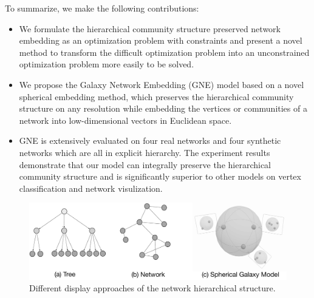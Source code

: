 \documentclass{article}
\theoremstyle{definition}
\begin{document}
		To summarize, we make the following contributions:
		\begin{itemize}
		\item{
		We formulate the hierarchical community structure preserved network embedding as an optimization problem with constraints and present a novel method to transform the difficult optimization problem into an unconstrained optimization problem more easily to be solved.
		}
		\item{
		We propose the Galaxy Network Embedding (GNE) model based on a novel spherical embedding method, which preserves the hierarchical community structure on any resolution while embedding the vertices or communities of a network into low-dimensional vectors in Euclidean space.
		}
		\item{
		GNE is extensively evaluated on four real networks and four synthetic networks which are all in explicit hierarchy. The experiment results demonstrate that our model can integrally preserve the hierarchical community structure and is significantly superior to other models on vertex classification and network visulization.  
		}
		\end{itemize}
		
		
		\begin{figure}
			\centering
			\includegraphics[width=0.95\linewidth]{figure/Galaxy.pdf}
			\caption{Different display approaches of the network hierarchical structure.}
			\label{fig:intuition}
		\end{figure}
\end{document}
